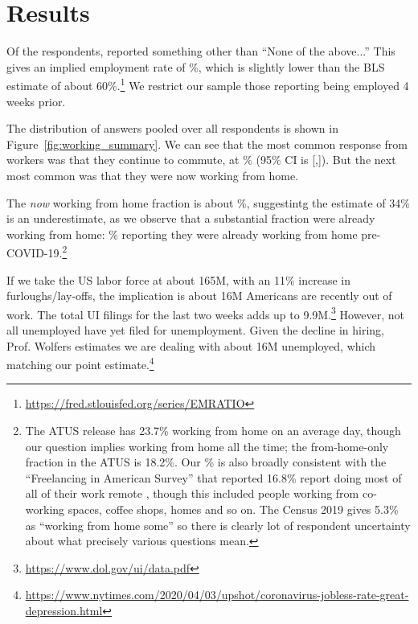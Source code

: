 \documentclass[12pt]{article}
\begin{document}
\section{Results}

Of the respondents, \numObsWorking{} reported something other than ``None of the above...''
This gives an implied employment rate of \LFPRhat{}\%, which is slightly lower than the BLS estimate of about 60\%.\footnote{
  \url{https://fred.stlouisfed.org/series/EMRATIO}
}
We restrict our sample those reporting being employed 4 weeks prior.

The distribution of answers pooled over all respondents is shown in Figure~\ref{fig:working_summary}. 
We can see that the most common response from workers was that they continue to commute, at \stillCommute{}\% (95\% CI is [\stillCommuteLB,\stillCommuteUB]). 
But the next most common was that they were now working from home. 

The \emph{now} working from home fraction is about \WFH{}\%, suggestintg the \cite{dingel2020} estimate of 34\% is an underestimate, as we observe that a substantial fraction were already working from home: \alreadyWFH{}\% reporting they were already working from home pre-COVID-19.\footnote{


  

  
The ATUS release has 23.7\% working from home on an average day, though our question implies working from home all the time; the from-home-only fraction in the ATUS is 18.2\%. 
Our \WFH{}\% is also broadly consistent with the ``Freelancing in American Survey'' that reported 16.8\% report doing most of all of their work remote \citep{upwork2019}, though this included people working from co-working spaces, coffee shops, homes and so on.
The Census 2019 gives 5.3\% as ``working from home some'' so there is clearly lot of respondent uncertainty about what precisely various questions mean.
}

If we take the US labor force at about 165M, with an 11\% increase in furloughs/lay-offs, the implication is about 16M Americans are recently out of work.
The total UI filings for the last two weeks adds up to 9.9M.\footnote{
  \url{https://www.dol.gov/ui/data.pdf}
}
However, not all unemployed have yet filed for unemployment.
Given the decline in hiring, Prof. Wolfers estimates we are dealing with about 16M unemployed, which matching our point estimate.\footnote{
  \url{https://www.nytimes.com/2020/04/03/upshot/coronavirus-jobless-rate-great-depression.html}
}
\end{document}
